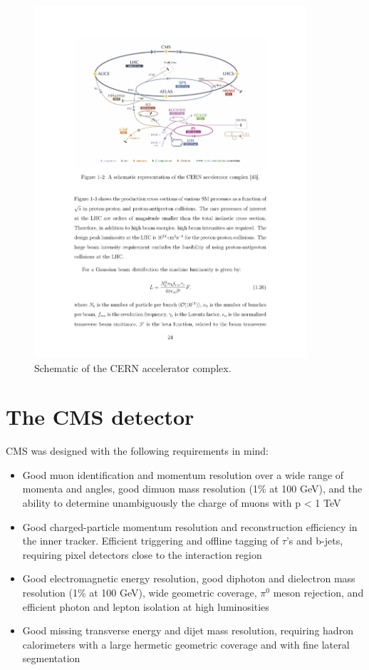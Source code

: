 \begin{figure}[hbtp]
\centering
\includegraphics[width=0.9\textwidth]{figures/lhc_protons.pdf}
\caption{Schematic of the CERN accelerator complex.}
\label{fig:lhc}
\end{figure}


\section{The CMS detector}

CMS was designed with the following requirements in mind:
\begin{itemize}
\item Good muon identification and momentum resolution over a wide range of momenta and
angles, good dimuon mass resolution (1\% at 100 GeV), and the ability to determine unambiguously
the charge of muons with p < 1 TeV
\item Good charged-particle momentum resolution and reconstruction efficiency in the inner
tracker. Efficient triggering and offline tagging of $\tau$'s and b-jets, requiring pixel detectors
close to the interaction region
\item Good electromagnetic energy resolution, good diphoton and dielectron mass resolution (1\% at 100 GeV),
wide geometric coverage, ${\pi}^{0}$ meson rejection, and efficient photon and lepton
isolation at high luminosities
\item Good missing transverse energy and dijet mass resolution, requiring hadron calorimeters
with a large hermetic geometric coverage and with fine lateral segmentation
\end{itemize}

